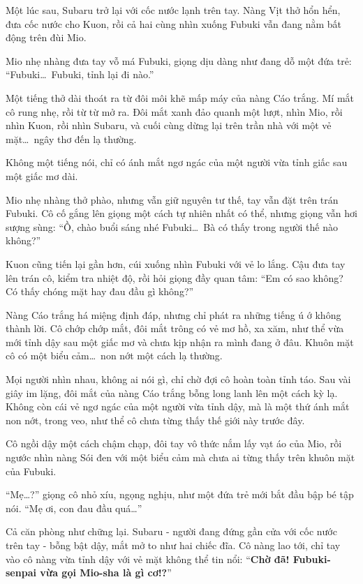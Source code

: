 \documentclass[../main.tex]{subfiles}
\begin{document}
\ct

Một lúc sau, Subaru trở lại với cốc nước lạnh trên tay. Nàng Vịt thở hổn hển, đưa cốc nước cho Kuon, rồi cả hai cùng nhìn xuống Fubuki vẫn đang nằm bất động trên đùi Mio.

Mio nhẹ nhàng đưa tay vỗ má Fubuki, giọng dịu dàng như đang dỗ một đứa trẻ: ``Fubuki\dots\ Fubuki, tỉnh lại đi nào.''

Một tiếng thở dài thoát ra từ đôi môi khẽ mấp máy của nàng Cáo trắng. Mí mắt cô rung nhẹ, rồi từ từ mở ra. Đôi mắt xanh đảo quanh một lượt, nhìn Mio, rồi nhìn Kuon, rồi nhìn Subaru, và cuối cùng dừng lại trên trần nhà với một vẻ mặt\dots\ ngây thơ đến lạ thường.

Không một tiếng nói, chỉ có ánh mắt ngơ ngác của một người vừa tỉnh giấc sau một giấc mơ dài.

Mio nhẹ nhàng thở phào, nhưng vẫn giữ nguyên tư thế, tay vẫn đặt trên trán Fubuki. Cô cố gắng lên giọng một cách tự nhiên nhất có thể, nhưng giọng vẫn hơi sượng sùng: ``Ồ, chào buổi sáng nhé Fubuki\dots\ Bà có thấy trong người thế nào không?''


Kuon cũng tiến lại gần hơn, cúi xuống nhìn Fubuki với vẻ lo lắng. Cậu đưa tay lên trán cô, kiểm tra nhiệt độ, rồi hỏi giọng đầy quan tâm: ``Em có sao không? Có thấy chóng mặt hay đau đầu gì không?''

Nàng Cáo trắng há miệng định đáp, nhưng chỉ phát ra những tiếng ú ớ không thành lời. Cô chớp chớp mắt, đôi mắt trông có vẻ mơ hồ, xa xăm, như thể vừa mới tỉnh dậy sau một giấc mơ và chưa kịp nhận ra mình đang ở đâu. Khuôn mặt cô có một biểu cảm\dots\ non nớt một cách lạ thường.

Mọi người nhìn nhau, không ai nói gì, chỉ chờ đợi cô hoàn toàn tỉnh táo. Sau vài giây im lặng, đôi mắt của nàng Cáo trắng bỗng long lanh lên một cách kỳ lạ. Không còn cái vẻ ngơ ngác của một người vừa tỉnh dậy, mà là một thứ ánh mắt non nớt, trong veo, như thể cô chưa từng thấy thế giới này trước đây.

Cô ngồi dậy một cách chậm chạp, đôi tay vô thức nắm lấy vạt áo của Mio, rồi ngước nhìn nàng Sói đen với một biểu cảm mà chưa ai từng thấy trên khuôn mặt của Fubuki.

``Mẹ\dots?'' giọng cô nhỏ xíu, ngọng nghịu, như một đứa trẻ mới bắt đầu bập bé tập nói. ``Mẹ ơi, con đau đầu quá\dots''

Cả căn phòng như chững lại. Subaru - người đang đứng gần cửa với cốc nước trên tay - bỗng bật dậy, mắt mở to như hai chiếc đĩa. Cô nàng lao tới, chỉ tay vào cô nàng vừa tỉnh dậy với vẻ mặt không thể tin nổi: ``\textbf{Chờ đã! Fubuki-senpai vừa gọi Mio-sha là gì cơ!?}''
\end{document}
